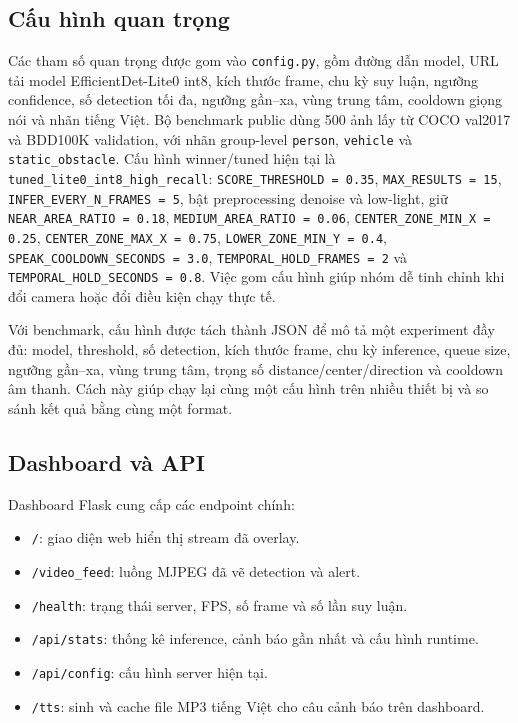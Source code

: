 \documentclass[oneside,final]{hcmut-report}
\begin{document}
\subsection{Cấu hình quan trọng}
Các tham số quan trọng được gom vào \texttt{config.py}, gồm đường dẫn model, URL tải model EfficientDet-Lite0 int8, kích thước frame, chu kỳ suy luận, ngưỡng confidence, số detection tối đa, ngưỡng gần--xa, vùng trung tâm, cooldown giọng nói và nhãn tiếng Việt. Bộ benchmark public dùng 500 ảnh lấy từ COCO val2017 và BDD100K validation, với nhãn group-level \texttt{person}, \texttt{vehicle} và \texttt{static\_obstacle}. Cấu hình winner/tuned hiện tại là \texttt{tuned\_lite0\_int8\_high\_recall}: \texttt{SCORE\_THRESHOLD = 0.35}, \texttt{MAX\_RESULTS = 15}, \texttt{INFER\_EVERY\_N\_FRAMES = 5}, bật preprocessing denoise và low-light, giữ \texttt{NEAR\_AREA\_RATIO = 0.18}, \texttt{MEDIUM\_AREA\_RATIO = 0.06}, \texttt{CENTER\_ZONE\_MIN\_X = 0.25}, \texttt{CENTER\_ZONE\_MAX\_X = 0.75}, \texttt{LOWER\_ZONE\_MIN\_Y = 0.4}, \texttt{SPEAK\_COOLDOWN\_SECONDS = 3.0}, \texttt{TEMPORAL\_HOLD\_FRAMES = 2} và \texttt{TEMPORAL\_HOLD\_SECONDS = 0.8}. Việc gom cấu hình giúp nhóm dễ tinh chỉnh khi đổi camera hoặc đổi điều kiện chạy thực tế.

Với benchmark, cấu hình được tách thành JSON để mô tả một experiment đầy đủ: model, threshold, số detection, kích thước frame, chu kỳ inference, queue size, ngưỡng gần--xa, vùng trung tâm, trọng số distance/center/direction và cooldown âm thanh. Cách này giúp chạy lại cùng một cấu hình trên nhiều thiết bị và so sánh kết quả bằng cùng một format.

\subsection{Dashboard và API}
Dashboard Flask cung cấp các endpoint chính:
\begin{itemize}
  \item \texttt{/}: giao diện web hiển thị stream đã overlay.
  \item \texttt{/video\_feed}: luồng MJPEG đã vẽ detection và alert.
  \item \texttt{/health}: trạng thái server, FPS, số frame và số lần suy luận.
  \item \texttt{/api/stats}: thống kê inference, cảnh báo gần nhất và cấu hình runtime.
  \item \texttt{/api/config}: cấu hình server hiện tại.
  \item \texttt{/tts}: sinh và cache file MP3 tiếng Việt cho câu cảnh báo trên dashboard.
\end{itemize}
\end{document}
